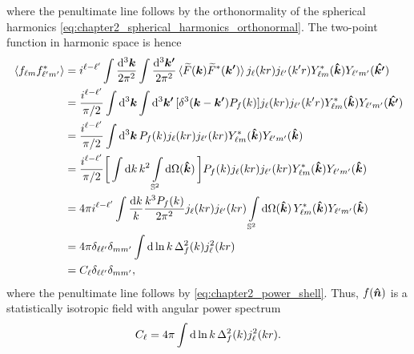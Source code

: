 %
where the penultimate line follows by the orthonormality of the spherical harmonics \cref{eq:chapter2_spherical_harmonics_orthonormal}.
The two-point function in harmonic space is hence
%
\begin{align}
    \expval*{\harmonic{f}\conj{\harmonic[']{f}}}
     & = i^{\ell-\ell'} \int\frac{\dd[3]{\vb*{k}}}{2\pi^{2}} \int\frac{\dd[3]{\vb*{k'}}}{2\pi^{2}} \expval*{\fourier{F}(\vb*{k}) \conj{\fourier{F}}(\vb*{k'})} \bessel{k r} \bessel[']{k'r} \conj{\harmonic{Y}}(\vu*{k}) \harmonic[']{Y}(\vu*{k'}) \nonumber{} \\
     & = \frac{i^{\ell-\ell'}}{\pi/2} \int\dd[3]{\vb*{k}} \int\dd[3]{\vb*{k'}} [\delta^{3}(\vb*{k} - \vb*{k'}) \powerSpectrumDim{f}] \bessel{k r} \bessel[']{k'r} \conj{\harmonic{Y}}(\vu*{k}) \harmonic[']{Y}(\vu*{k'}) \nonumber{}                           \\
     & = \frac{i^{\ell-\ell'}}{\pi/2} \int\dd[3]{\vb*{k}} \powerSpectrumDim{f} \bessel{k r} \bessel[']{k r} \conj{\harmonic{Y}}(\vu*{k}) \harmonic[']{Y}(\vu*{k}) \nonumber{}                                                                                  \\
     & = \frac{i^{\ell-\ell'}}{\pi/2} \bigg[\int\dd{k} k^{2} \integrateSphere{\vu*{k}}\bigg] \powerSpectrumDim{f} \bessel{k r} \bessel[']{k r} \conj{\harmonic{Y}}(\vu*{k}) \harmonic[']{Y}(\vu*{k}) \nonumber{}                                               \\
     & = 4\pi i^{\ell-\ell'} \int\frac{\dd{k}}{k} \frac{k^{3}\powerSpectrumDim{f}}{2\pi^{2}} \bessel{k r} \bessel[']{k r} \integrateSphere{\vu*{k}} \conj{\harmonic{Y}}(\vu*{k}) \harmonic[']{Y}(\vu*{k}) \nonumber{}                                          \\
     & = 4\pi \delta_{\ell\ell'} \delta_{m m'} \int\dd{\ln{k}} \Delta_{f}^{2}(k) j^{2}_{\ell}(k r) \nonumber{}                                                                                                                                                 \\
     & = \powerSpectrum \delta_{\ell\ell'} \delta_{m m'},
\end{align}
%
where the penultimate line follows by \cref{eq:chapter2_power_shell}.
Thus, \(f(\vu*{n})\) is a statistically isotropic field with angular power spectrum
%
\begin{equation}
    \powerSpectrum
    = 4\pi \int\dd{\ln{k}} \Delta_{f}^{2}(k) j^{2}_{\ell}(k r).
\end{equation}

